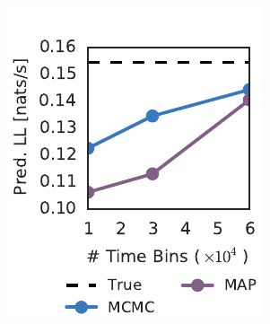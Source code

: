 \begin{figure}[t!]
\begin{subfigure}[b]{1.8in}
    \includegraphics[width=\textwidth]{figures/ch3/synth_rgc_pred_ll.pdf}
    \label{fig:synth_rgc_predll}
  \end{subfigure}
  ~
  \begin{subfigure}[b]{1.8in}
    \centering
    \caption{}
    \vspace{-.25in}

\end{subfigure}
\end{figure}
